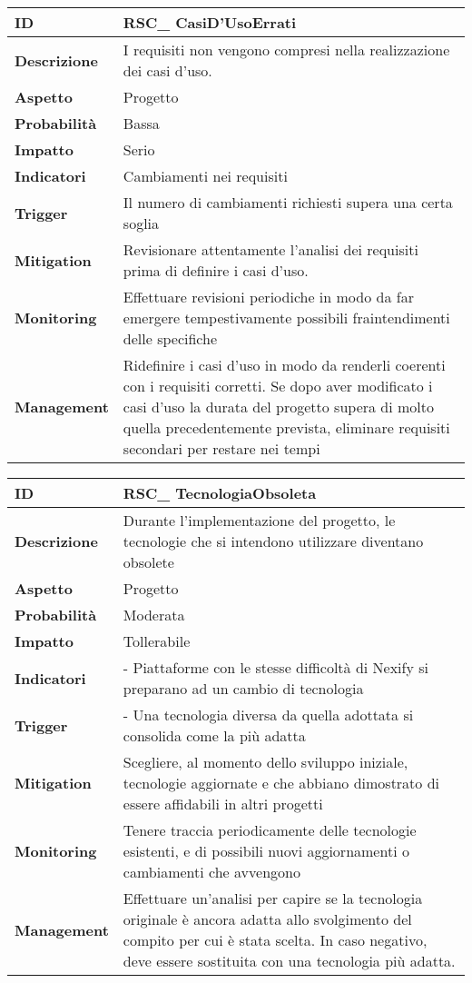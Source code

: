 \begin{tabular}{|p{2.2cm}|p{9.6cm}| }
 	\hline
	\textbf{ID} & RSC\_ CasiD'UsoErrati\\ [0.5ex] 
	\hline
	\textbf{Descrizione} & I requisiti non vengono compresi nella realizzazione dei casi d'uso.\\ 
	\hline
	\textbf{Aspetto} &  Progetto\\
	\hline
	\textbf{Probabilità} &  Bassa \\ 
	\hline
	\textbf{Impatto} &  Serio \\ 
	\hline
	\textbf{Indicatori} & Cambiamenti nei requisiti\\
	\hline
	\textbf{Trigger} & Il numero di cambiamenti richiesti supera una certa soglia\\
	\hline
	\textbf{Mitigation} & Revisionare attentamente l'analisi dei requisiti prima di definire i casi d'uso.\\ 
	\hline
	\textbf{Monitoring} & Effettuare revisioni periodiche in modo da far emergere tempestivamente possibili fraintendimenti delle specifiche\\ 
	\hline
	\textbf{Management} & Ridefinire i casi d'uso in modo da renderli coerenti con i requisiti corretti. Se dopo aver modificato i casi d'uso la durata del progetto supera di molto quella precedentemente prevista, eliminare requisiti secondari per restare nei tempi \\ 
	\hline
\end{tabular}
\clearpage
\begin{tabular}{|p{2.2cm}|p{9.6cm}| }
	\hline
   \textbf{ID} & RSC\_ TecnologiaObsoleta\\ [0.5ex] 
   \hline
   \textbf{Descrizione} & Durante l'implementazione del progetto, le tecnologie che si intendono utilizzare diventano obsolete \\ 
   \hline
   \textbf{Aspetto} &  Progetto \\
   \hline
   \textbf{Probabilità} & Moderata\\ 
   \hline
   \textbf{Impatto} & Tollerabile\\
	\hline
	\textbf{Indicatori} & - Piattaforme con le stesse difficoltà di Nexify si preparano ad un cambio di tecnologia\\
	\hline
	\textbf{Trigger} & - Una tecnologia diversa da quella adottata si consolida come la più adatta\\
   \hline
   \textbf{Mitigation} & Scegliere, al momento dello sviluppo iniziale, tecnologie aggiornate e che abbiano dimostrato di essere affidabili in altri progetti \\ 
   \hline
   \textbf{Monitoring} & Tenere traccia periodicamente delle tecnologie esistenti, e di possibili nuovi aggiornamenti o cambiamenti che avvengono \\ 
   \hline
   \textbf{Management} & Effettuare un’analisi per capire se la tecnologia originale è ancora adatta allo svolgimento del compito per cui è stata scelta. In caso negativo, deve essere sostituita con una tecnologia più adatta.\\ 
   \hline
\end{tabular}


